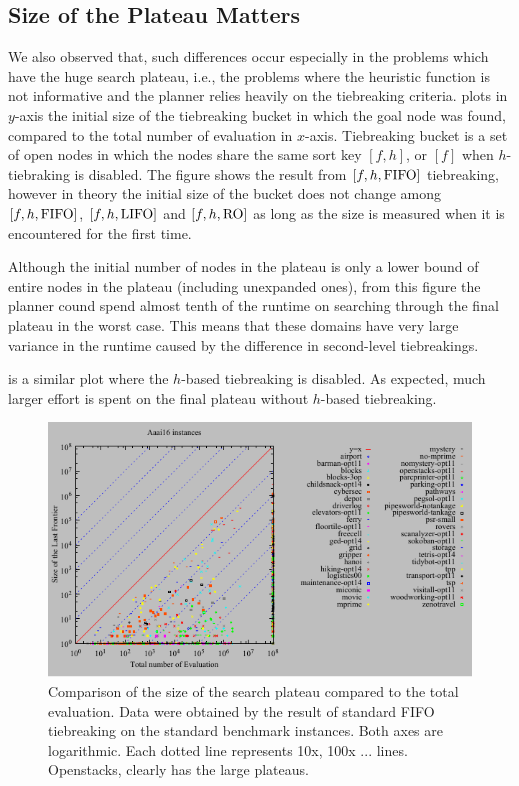 \subsection{Size of the Plateau Matters}

We also observed that, such differences occur especially in the problems which
have the huge search plateau, i.e., the problems where the heuristic
function is not informative and the planner relies heavily on the
tiebreaking criteria.
% 
 plots in $y$-axis the initial size of the tiebreaking bucket in
which the goal node was found, compared to the total number of
evaluation in $x$-axis. Tiebreaking bucket is a set of open nodes in which the
nodes share the same sort key $[f,h]$, or $[f]$ when $h$-tiebraking is
disabled. 
The figure shows the result from $[f,h,\mbox{FIFO}]$ tiebreaking, however in
theory the initial size of the bucket does not change among
$[f,h,\mbox{FIFO}]$, $[f,h,\mbox{LIFO}]$ and $[f,h,\mbox{RO}]$ as long as the size
is measured when it is encountered for the first time.

Although the initial number of nodes in the plateau is only a lower
bound of entire nodes in the plateau (including unexpanded ones), from
this figure the planner cound spend almost tenth of the runtime on
searching through the final plateau in the worst case. This means that
these domains have very large variance in the runtime caused by the
difference in second-level tiebreakings.

% 
 is a similar plot where the $h$-based tiebreaking is
disabled. As expected, much larger effort is spent on the final plateau
without $h$-based tiebreaking.

\begin{figure}[htb]
 \centering
 \includegraphics{tables/aaai16-front-vs-evaluated.pdf}
 \caption{Comparison of the size of the search plateau compared to the total evaluation. Data were obtained by the result of standard FIFO tiebreaking on the standard benchmark instances. Both axes are logarithmic. Each dotted line represents 10x, 100x ... lines.  Openstacks,  clearly has the large plateaus.}
 \label{plateau-h}
\end{figure}

